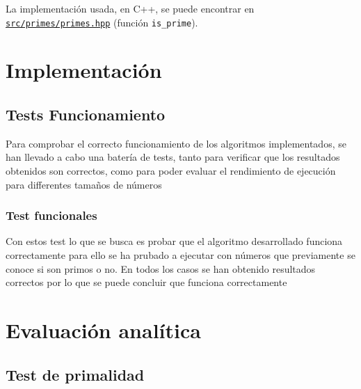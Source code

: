 La implementación usada, en C++, se puede encontrar en \href{run:./src/primes/primes.hpp}{\texttt{src/primes/primes.hpp}} (función \texttt{is\_prime}).

\section{Implementación}
\subsection{Tests Funcionamiento }
Para comprobar el correcto funcionamiento de los algoritmos implementados, se han llevado a cabo una batería de tests, tanto para verificar que los resultados obtenidos son correctos, como para poder evaluar el rendimiento de ejecución para differentes tamaños de números


\subsubsection{Test funcionales}

Con estos test lo que se busca es probar que el algoritmo desarrollado funciona correctamente para ello se ha prubado a ejecutar con números que previamente se conoce si son primos o no. En todos los casos se han obtenido resultados correctos por lo que se puede concluir que funciona correctamente
\begin{figure}[H]
\end{figure}
  

\section{Evaluación analítica}
\subsection{Test de primalidad}

